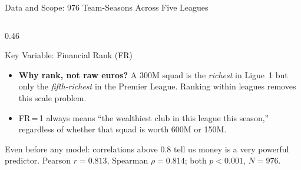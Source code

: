 \documentclass[aspectratio=1610,10pt]{beamer}
\begin{document}
\begin{frame}[shrink=8]{Data and Scope: 976 Team-Seasons Across Five Leagues}
\begin{columns}[T]
\begin{column}{0.46\textwidth}
\begin{block}{Key Variable: Financial Rank (FR)}
{\begin{itemize}
{                each league-season}: FR\,=\,1 richest,
                FR\,=\,$n$ least wealthy.
          \item \textbf{Why rank, not raw euros?}
                A \texteuro{}300M squad is the \emph{richest}
                in Ligue~1 but only the \emph{fifth-richest}
                in the Premier League. Ranking within leagues
                removes this scale problem.
          \item FR\,=\,1 always means ``the wealthiest club
                in this league this season,'' regardless of
                whether that squad is worth \texteuro{}600M
                or \texteuro{}150M.
        \end{itemize}}
      \end{block}
      \vspace{4pt}
      {\footnotesize\color{SlateGrey}
        Even before any model: correlations above 0.8
        tell us money is a very powerful predictor.
        Pearson $r = 0.813$, Spearman $\rho = 0.814$;
        both $p < 0.001$, $N = 976$.}
    \end{column}
  \end{columns}
\end{frame}
\end{document}
